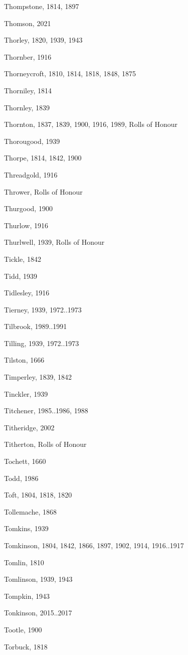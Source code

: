 \begin{theindex}
\item Thompstone, 1814, 1897
\item Thomson, 2021
\item Thorley, 1820, 1939, 1943
\item Thornber, 1916
\item Thorneycroft, 1810, 1814, 1818, 1848, 1875
\item Thorniley, 1814
\item Thornley, 1839
\item Thornton, 1837, 1839, 1900, 1916, 1989, Rolls of Honour
\item Thorougood, 1939
\item Thorpe, 1814, 1842, 1900
\item Threadgold, 1916
\item Thrower, Rolls of Honour
\item Thurgood, 1900
\item Thurlow, 1916
\item Thurlwell, 1939, Rolls of Honour
\item Tickle, 1842
\item Tidd, 1939
\item Tidlesley, 1916
\item Tierney, 1939, 1972..1973
\item Tilbrook, 1989..1991
\item Tilling, 1939, 1972..1973
\item Tilston, 1666
\item Timperley, 1839, 1842
\item Tinckler, 1939
\item Titchener, 1985..1986, 1988
\item Titheridge, 2002
\item Titherton, Rolls of Honour
\item Tochett, 1660
\item Todd, 1986
\item Toft, 1804, 1818, 1820
\item Tollemache, 1868
\item Tomkins, 1939
\item Tomkinson, 1804, 1842, 1866, 1897, 1902, 1914, 1916..1917
\item Tomlin, 1810
\item Tomlinson, 1939, 1943
\item Tompkin, 1943
\item Tonkinson, 2015..2017
\item Tootle, 1900
\item Torbuck, 1818

\end{theindex}
